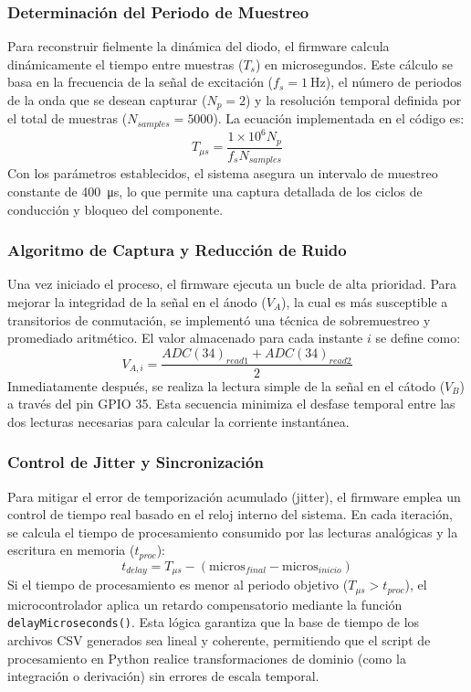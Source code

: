 \documentclass[conference]{IEEEtran}
\begin{document}
\subsubsection{Determinación del Periodo de Muestreo}
Para reconstruir fielmente la dinámica del diodo, el firmware calcula dinámicamente el tiempo entre muestras ($T_s$) en microsegundos. Este cálculo se basa en la frecuencia de la señal de excitación ($f_s = \SI{1}{\hertz}$), el número de periodos de la onda que se desean capturar ($N_p = 2$) y la resolución temporal definida por el total de muestras ($N_{samples} = 5000$). La ecuación implementada en el código es:
\begin{equation}
    T_{\mu s} = \frac{1 \times 10^6 N_p}{f_s N_{samples}}
    \label{eq:periodo_muestreo}
\end{equation}
Con los parámetros establecidos, el sistema asegura un intervalo de muestreo constante de \SI{400}{\micro\second}, lo que permite una captura detallada de los ciclos de conducción y bloqueo del componente.

\subsubsection{Algoritmo de Captura y Reducción de Ruido}
Una vez iniciado el proceso, el firmware ejecuta un bucle de alta prioridad. Para mejorar la integridad de la señal en el ánodo ($V_A$), la cual es más susceptible a transitorios de conmutación, se implementó una técnica de sobremuestreo y promediado aritmético. El valor almacenado para cada instante $i$ se define como:
\begin{equation}
    V_{A,i} = \frac{ADC(34)_{read1} + ADC(34)_{read2}}{2}
\end{equation}
Inmediatamente después, se realiza la lectura simple de la señal en el cátodo ($V_B$) a través del pin GPIO 35. Esta secuencia minimiza el desfase temporal entre las dos lecturas necesarias para calcular la corriente instantánea.

\subsubsection{Control de Jitter y Sincronización}
Para mitigar el error de temporización acumulado (jitter), el firmware emplea un control de tiempo real basado en el reloj interno del sistema. En cada iteración, se calcula el tiempo de procesamiento consumido por las lecturas analógicas y la escritura en memoria ($t_{proc}$):
\begin{equation}
    t_{delay} = T_{\mu s} - (\text{micros}_{final} - \text{micros}_{inicio})
\end{equation}
Si el tiempo de procesamiento es menor al periodo objetivo ($T_{\mu s} > t_{proc}$), el microcontrolador aplica un retardo compensatorio mediante la función \texttt{delayMicroseconds()}. Esta lógica garantiza que la base de tiempo de los archivos CSV generados sea lineal y coherente, permitiendo que el script de procesamiento en Python realice transformaciones de dominio (como la integración o derivación) sin errores de escala temporal.
\end{document}
